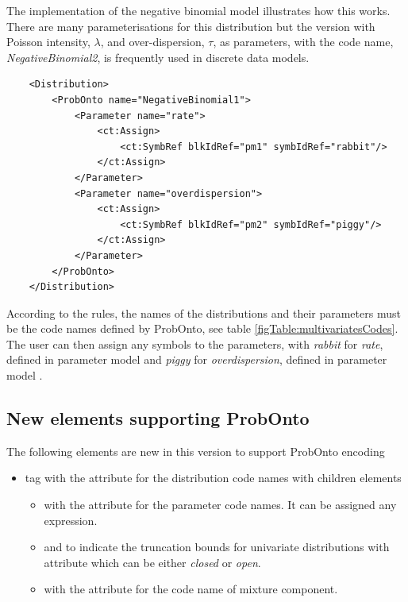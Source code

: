 \begin{example}
The implementation of the negative binomial model illustrates how this works. There are many 
parameterisations for this distribution but the version with Poisson intensity, $\lambda$, 
and over-dispersion, $\tau$, as parameters, with the code name, \emph{NegativeBinomial2}, 
is frequently used in discrete data models.
\lstset{language=XML}
\begin{lstlisting}
    <Distribution>
        <ProbOnto name="NegativeBinomial1">
            <Parameter name="rate">
                <ct:Assign>
                    <ct:SymbRef blkIdRef="pm1" symbIdRef="rabbit"/>
                </ct:Assign>
            </Parameter>
            <Parameter name="overdispersion">
                <ct:Assign>
                    <ct:SymbRef blkIdRef="pm2" symbIdRef="piggy"/>
                </ct:Assign>
            </Parameter>
        </ProbOnto>
    </Distribution>
\end{lstlisting}
%	
According to the rules, the names of the distributions and their parameters 
must be the code names defined by ProbOnto, see table \ref{figTable:multivariatesCodes}. 
The user can then assign any symbols to the parameters,
with \emph{rabbit} for \emph{rate}, defined in 
parameter model  and \emph{piggy} for \emph{overdispersion}, 
defined in parameter model .
\end{example}

\subsection{New elements supporting ProbOnto}
The following elements are new in this version to support ProbOnto encoding 
\begin{itemize}
\item
{} tag with the  attribute for the distribution code names
 with children elements
\begin{itemize}
\item
{} with the  attribute for the parameter code names. 
It can be assigned any expression.
\item
{} and  to indicate the
truncation bounds for univariate distributions with attribute  which can
be either \emph{closed} or \emph{open}.
\item
{} with the  attribute for the code name of mixture 
component.
\end{itemize}
\end{itemize}



